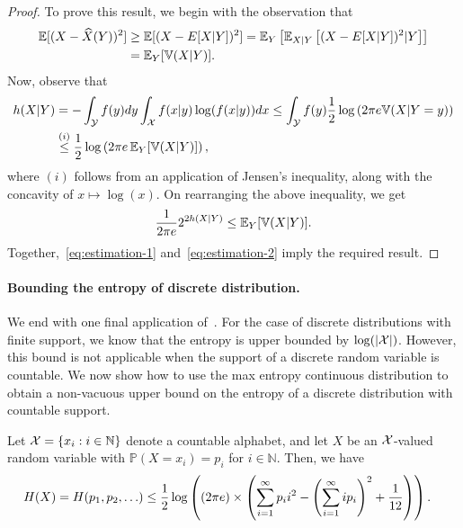         \begin{proof}
            To prove this result, we begin with the observation that 
            \begin{align}
                \mathbb{E}[(X - \widehat{X}(Y))^2] &\geq \mathbb{E}[ (X - E[X|Y])^2 ] = \mathbb{E}_Y \left[ \mathbb{E}_{X|Y} \left[ (X - E[X|Y])^2 |Y\right] \right]  \\
                & =  \mathbb{E}_Y[\mathbb{V}(X|Y)].  \label{eq:estimation-1}
            \end{align}
        Now, observe that 
        \begin{align}
            h(X|Y) &= -\int_{\mathcal{Y}} f(y)dy  \int_{\mathcal{X}} f(x|y) \log (f(x|y)) dx \leq \int_{\mathcal{Y}} f(y) \frac{1}{2}\log \left( 2 \pi e \mathbb{V}(X|Y=y) \right) \\ 
            & \stackrel{(i)}{\leq} \frac{1}{2} \log \left( 2 \pi e \, \mathbb{E}_Y[\mathbb{V}(X|Y)] \right), 
        \end{align}
        where $(i)$ follows from an application of  Jensen's inequality, along with the concavity of $x \mapsto \log(x)$. On rearranging the above inequality, we get 
        \begin{align}
            \frac{1}{2\pi e} 2^{2h(X|Y)} \leq \mathbb{E}_Y[\mathbb{V}(X|Y)]. \label{eq:estimation-2}
        \end{align}
        Together,~\eqref{eq:estimation-1} and~\eqref{eq:estimation-2} imply the required result. 
        \end{proof}


        \paragraph{Bounding the entropy of discrete distribution.} We end with one final application of~. For the case of discrete distributions with finite support, we know that the entropy is upper bounded by $\log(|\mathcal{X}|)$. However, this bound is not applicable when the support of a discrete random variable is countable. We now show how to use the max entropy continuous distribution to obtain a non-vacuous upper bound on the entropy of  a discrete distribution with countable support. 

        \begin{proposition}
            \label{prop:diff-ent-bound-on-discrete}
            Let $\mathcal{X} = \{x_i: i \in \mathbb{N}\}$ denote a countable alphabet, and let $X$ be an $\mathcal{X}$-valued random variable with $\mathbb{P}(X=x_i)=p_i$ for $i \in \mathbb{N}$. Then, we have 
        \begin{align}
            H(X) = H(p_1, p_2, \ldots) &\leq \frac{1}{2} \log \left( (2\pi e) \times \left( \sum_{i=1}^{\infty} p_i i^2 - \left( \sum_{i=1}^{\infty} i p_i \right)^2 + \frac{1}{12} \right) \right). 
        \end{align}
        \end{proposition}

